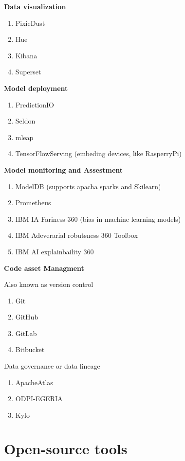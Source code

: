\documentclass{article}
\begin{document}
\textbf{Data visualization}

\begin{enumerate}
      \item PixieDust
      \item Hue
      \item Kibana
      \item Superset          
\end{enumerate}

\textbf{Model deployment}

\begin{enumerate}
      \item PredictionIO
      \item Seldon
      \item mleap
      \item TensorFlowServing (embeding devices, like RasperryPi)
\end{enumerate}


\textbf{ Model monitoring and Assestment}

\begin{enumerate} 
    \item ModelDB (supports apacha sparks and Skilearn)
    \item Prometheus
    \item IBM IA Fariness 360 (bias in machine learning models)
    \item IBM Adeverarial robutsness 360 Toolbox
    \item IBM AI explainbaility 360  
\end{enumerate} 

\textbf{ Code asset Managment}

Also known as version control
\begin{enumerate} 
    \item Git
    \item GitHub
    \item GitLab
    \item Bitbucket 
\end{enumerate}
  
Data governance or data lineage
\begin{enumerate} 
    \item ApacheAtlas
    \item ODPI-EGERIA
    \item Kylo 
\end{enumerate}

\section{Open-source tools}
\end{document}
